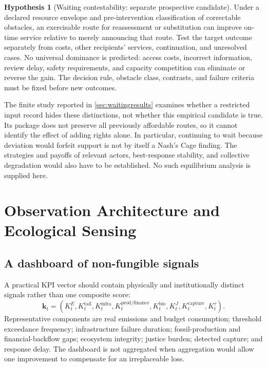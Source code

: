 \documentclass[11pt,a4paper]{article}
\numberwithin{equation}{section}
\theoremstyle{definition}
\newtheorem{hypothesis}[definition]{Hypothesis}
\theoremstyle{plain}
\theoremstyle{remark}
\newcommand{\kpi}{\bm{k}}
\begin{document}
\begin{hypothesis}[Waiting contestability: separate prospective candidate]
\label{hyp:contestability}
Under a declared resource envelope and pre-intervention classification of correctable obstacles, an exercisable route for reassessment or substitution can improve on-time service relative to merely announcing that route. Test the target outcome separately from costs, other recipients' services, continuation, and unresolved cases. No universal dominance is predicted: access costs, incorrect information, review delay, safety requirements, and capacity competition can eliminate or reverse the gain. The decision rule, obstacle class, contrasts, and failure criteria must be fixed before new outcomes.
\end{hypothesis}

The finite study reported in \cref{sec:waitingresults} examines whether a restricted input record hides these distinctions, not whether this empirical candidate is true. Its package does not preserve all previously affordable routes, so it cannot identify the effect of adding rights alone. In particular, continuing to wait because deviation would forfeit support is not by itself a Nash's Cage finding. The strategies and payoffs of relevant actors, best-response stability, and collective degradation would also have to be established. No such equilibrium analysis is supplied here.

\section{Observation Architecture and Ecological Sensing}

\subsection{A dashboard of non-fungible signals}

A practical KPI vector should contain physically and institutionally distinct signals rather than one composite score:
\begin{equation}
\kpi_t=
\left(
K_t^{E},K_t^{\mathrm{tail}},K_t^{\mathrm{infra}},K_t^{\mathrm{prod/finance}},
K_t^{\mathrm{bio}},K_t^{J},K_t^{\mathrm{capture}},K_t^{\tau}
\right).
\label{eq:dashboard}
\end{equation}
Representative components are real emissions and budget consumption; threshold exceedance frequency; infrastructure failure duration; fossil-production and financial-backflow gaps; ecosystem integrity; justice burden; detected capture; and response delay. The dashboard is not aggregated when aggregation would allow one improvement to compensate for an irreplaceable loss.
\end{document}
